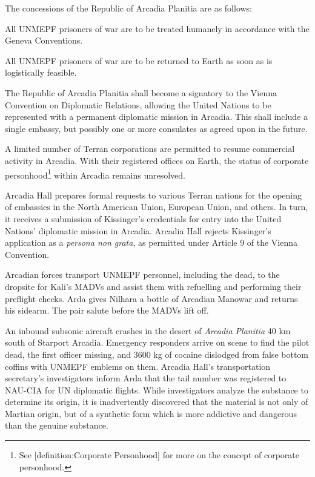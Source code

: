 The concessions of the Republic of Arcadia Planitia are as follows:
\startitemize[n]
\item All UNMEPF prisoners of war are to be treated humanely in accordance with the Geneva Conventions.
\item All UNMEPF prisoners of war are to be returned to Earth as soon as is logistically feasible.
\item The Republic of Arcadia Planitia shall become a signatory to the Vienna Convention on Diplomatic Relations, allowing the United Nations to be represented with a permanent diplomatic mission in Arcadia. This shall include a single embassy, but possibly one or more consulates as agreed upon in the future.
\item A limited number of Terran corporations are permitted to resume commercial activity in Arcadia. With their registered offices on Earth, the status of corporate personhood\footnote{See [definition:Corporate Personhood] for more on the concept of corporate personhood.} within Arcadia remains unresolved.
\stopitemize

Arcadia Hall prepares formal requests to various Terran nations for the opening of embassies in the North American Union, European Union, and others. In turn, it receives a submission of Kissinger's credentials for entry into the United Nations' diplomatic mission in Arcadia. Arcadia Hall rejects Kissinger's application as a {\it persona non grata}, as permitted under Article 9 of the Vienna Convention.
\StopTimelineDate

Arcadian forces transport UNMEPF personnel, including the dead, to the dropsite for Kali's MADVs and assist them with refuelling and performing their preflight checks. Arda gives Nilhara a bottle of Arcadian Manowar and returns his sidearm. The pair salute before the MADVs lift off.
\StopTimelineDate

An inbound subsonic aircraft crashes in the desert of {\it Arcadia Planitia} 40 km south of Starport Arcadia. Emergency responders arrive on scene to find the pilot dead, the first officer missing, and 3600 kg of cocaine dislodged from false bottom coffins with UNMEPF emblems on them. Arcadia Hall's transportation secretary's investigators inform Arda that the tail number was registered to NAU-CIA for UN diplomatic flights. While investigators analyze the substance to determine its origin, it is inadvertently discovered that the material is not only of Martian origin, but of a synthetic form which is more addictive and dangerous than the genuine substance.
\StopTimelineDate

